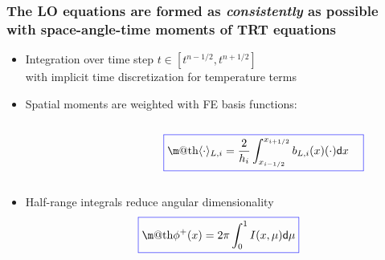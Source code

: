 \documentclass[xcolor=dvipsnames,hyperref={pdfpagelabels=false},unknownkeysallowed]{beamer}
\makeatletter
\newcommand*{\boxedcolor}{blue}
\renewcommand{\boxed}[1]{\textcolor{\boxedcolor}{%
  \fbox{\normalcolor\m@th$\displaystyle#1$}}}
\newcommand{\colb}[1]{{\color{blue} #1}}
\newcommand{\colG}[1]{{\color{Gray!110} #1}}
\newlength{\wideitemsep}
\let\olditem\item
\renewcommand{\item}{\setlength{\itemsep}{\wideitemsep}\olditem}
\renewcommand{\d}{\mathsf{d}}
\newcommand{\mom}[1]{\langle #1 \rangle}
\newcommand{\il}{{i-1/2}}
\newcommand{\ir}{{i+1/2}}
\makeatother
\begin{document}
\begin{frame}
    \frametitle{The LO equations are formed as \emph{consistently} as possible
        \\ with space-angle-time moments of TRT equations}
    \begin{itemize} \vspace{0.15in}
        \item[] Integration over time step $t \in [t^{n-1/2},t^{n+1/2}]$ \\ \colG{with implicit
            time discretization for temperature terms}
        \item[] Spatial moments are weighted with FE basis functions:   \end{itemize}
    \begin{columns}
        \begin{column}{0.5\textwidth}
    \begin{centering}
    \end{centering}
        \end{column}
        \begin{column}{0.5\textwidth}
        \begin{equation*}
        \boxed{\displaystyle \mom{\cdot}_{L,i} = \frac{2}{h_i} \int_{x_\il}^{x_\ir}
        b_{L,i}(x)(\cdot) \d x \quad }  
        \end{equation*}
    \end{column}
\end{columns}
\begin{itemize}
        \vspace{0.2in}
    \item[] Half-range integrals reduce angular dimensionality
    \begin{equation*}
        \boxed{{\displaystyle \phi^+(x) =
        2\pi\int_0^1 I(x,\mu) \d \mu}}
    \end{equation*}
\end{itemize}
\end{frame}
\end{document}
